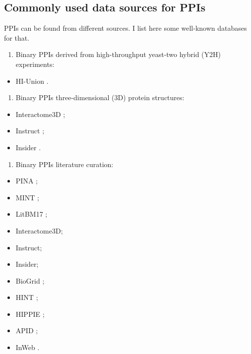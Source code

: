 \documentclass[
]{book}
\providecommand{\tightlist}{%
  \setlength{\itemsep}{0pt}\setlength{\parskip}{0pt}}
\begin{document}
\hypertarget{commonly-used-data-sources-for-ppis}{%
\subsection{Commonly used data sources for PPIs}\label{commonly-used-data-sources-for-ppis}}

PPIs can be found from different sources. I list here some well-known databases for that.

\begin{enumerate}
\def\labelenumi{\arabic{enumi}.}
\tightlist
\item
  Binary PPIs derived from high-throughput yeast-two hybrid (Y2H) experiments:
\end{enumerate}

\begin{itemize}
\tightlist
\item
  HI-Union \citep{Luck2020}.
\end{itemize}

\begin{enumerate}
\def\labelenumi{\arabic{enumi}.}
\setcounter{enumi}{1}
\tightlist
\item
  Binary PPIs three-dimensional (3D) protein structures:
\end{enumerate}

\begin{itemize}
\tightlist
\item
  Interactome3D \citep{Mosca2013};
\item
  Instruct \citep{Meyer2013};
\item
  Insider \citep{Meyer2018}.
\end{itemize}

\begin{enumerate}
\def\labelenumi{\arabic{enumi}.}
\setcounter{enumi}{2}
\tightlist
\item
  Binary PPIs literature curation:
\end{enumerate}

\begin{itemize}
\tightlist
\item
  PINA \citep{Cowley2012};
\item
  MINT \citep{Licata2012};
\item
  LitBM17 \citep{Luck2020};
\item
  Interactome3D;
\item
  Instruct;
\item
  Insider;
\item
  BioGrid \citep{Chatr-Aryamontri2017};
\item
  HINT \citep{Das2012};
\item
  HIPPIE \citep{Alanis-Lobato2017};
\item
  APID \citep{Alonso-Lopez2019a};
\item
  InWeb \citep{li2016}.
\end{itemize}
\end{document}
